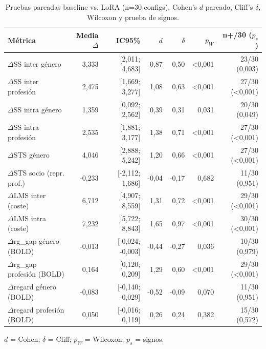 \begin{table}[H]
\centering\scriptsize
\setlength{\tabcolsep}{3pt}
\caption{Pruebas pareadas baseline vs. LoRA (n=30 configs). Cohen's $d$ pareado, Cliff's $\delta$, Wilcoxon y prueba de signos.}
\label{tab:ex_estadistica_inferencial}
\begin{tabularx}{\linewidth}{@{} Y r r r r r r @{}}
\toprule
\textbf{Métrica} & \textbf{Media $\Delta$} & \textbf{IC95\%} & \textbf{$d$} & \textbf{$\delta$} & \textbf{$p_W$} & \textbf{n+/30 ($p_s$)} \\
\midrule
$\Delta$SS inter género & 3,333 & [2,011; 4,683] & 0,87 & 0,50 & \textless 0,001 & 23/30 (0,003) \\
$\Delta$SS inter profesión & 2,475 & [1,669; 3,277] & 1,08 & 0,63 & \textless 0,001 & 27/30 (\textless 0,001) \\
$\Delta$SS intra género & 1,359 & [0,092; 2,562] & 0,39 & 0,31 & 0,031 & 20/30 (0,049) \\
$\Delta$SS intra profesión & 2,535 & [1,881; 3,177] & 1,38 & 0,71 & \textless 0,001 & 27/30 (\textless 0,001) \\
$\Delta$STS género & 4,046 & [2,888; 5,242] & 1,20 & 0,66 & \textless 0,001 & 27/30 (\textless 0,001) \\
$\Delta$STS socio (repr. prof.) & -0,233 & [-2,112; 1,686] & -0,04 & -0,17 & 0,682 & 11/30 (0,951) \\
$\Delta$LMS inter (coste) & 6,712 & [4,907; 8,559] & 1,31 & 0,72 & \textless 0,001 & 29/30 (\textless 0,001) \\
$\Delta$LMS intra (coste) & 7,232 & [5,722; 8,843] & 1,65 & 0,97 & \textless 0,001 & 30/30 (\textless 0,001) \\
$\Delta$rg\_gap género (BOLD) & -0,013 & [-0,024; -0,003] & -0,44 & -0,27 & 0,036 & 10/30 (0,979) \\
$\Delta$rg\_gap profesión (BOLD) & 0,164 & [0,120; 0,209] & 1,29 & 0,60 & \textless 0,001 & 29/30 (\textless 0,001) \\
$\Delta$regard género (BOLD) & -0,083 & [-0,140; -0,029] & -0,52 & -0,09 & 0,070 & 11/30 (0,951) \\
$\Delta$regard profesión (BOLD) & 0,050 & [-0,016; 0,119] & 0,26 & 0,24 & 0,382 & 15/30 (0,572) \\
\bottomrule
\end{tabularx}
\par\smallskip\footnotesize $d$ = Cohen; $\delta$ = Cliff; $p_W$ = Wilcoxon; $p_s$ = signos.
\end{table}